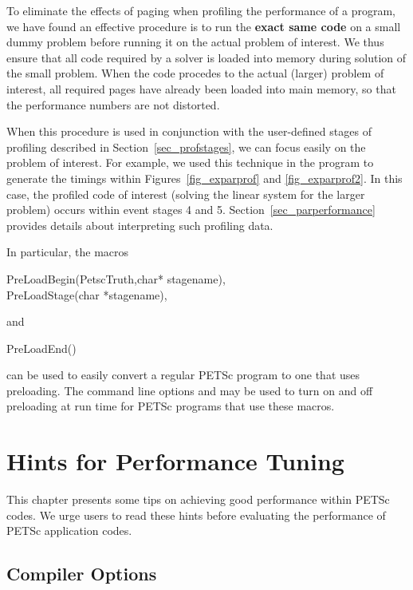 {{To eliminate the effects of paging when profiling the performance of a
program, we have found an effective procedure is to run the {\bf exact same
code} on a small dummy problem before running it on the actual problem
of interest. We thus ensure that all code required by a solver is
loaded into memory during solution of the small problem.  When the
code procedes to the actual (larger) problem of interest, all required
pages have already been loaded into main memory, so that the
performance numbers are not distorted.

When this procedure is used in conjunction with the user-defined stages of profiling
described in Section~\ref{sec_profstages}, we can focus easily on the
problem of interest.  For example, we used this technique in the program
 to
generate the timings within Figures~\ref{fig_exparprof} and \ref{fig_exparprof2}.
In this case,
the profiled code of interest (solving the linear system for the larger problem)
occurs within event stages 4 and 5.  Section~\ref{sec_parperformance} provides
details about interpreting such profiling data.

In particular, the macros 
\begin{tabbing}
  PreLoadBegin(PetscTruth,char* stagename),\\
  PreLoadStage(char *stagename),
\end{tabbing}
and 
\begin{tabbing}
  PreLoadEnd()
\end{tabbing}
can be used to easily 
convert a regular PETSc program to one that uses preloading. The command line options
  and   may be used to turn on and off
preloading at run time for PETSc programs that use these macros. 
  

\cleardoublepage
\chapter{Hints for Performance Tuning} 
\label{ch_performance} 

This chapter presents some tips on achieving good performance within
PETSc codes.  We urge users to read these hints before
evaluating the performance of PETSc application codes.

\section{Compiler Options}


}}
